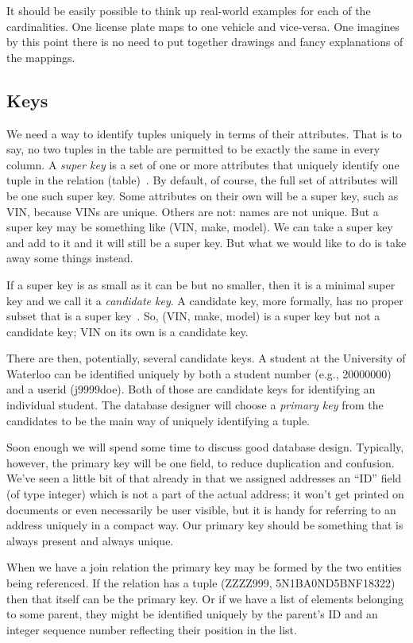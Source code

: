 It should be easily possible to think up real-world examples for each of the cardinalities. One license plate maps to one vehicle and vice-versa. One imagines by this point there is no need to put together drawings and fancy explanations of the mappings.

\subsection*{Keys}

We need a way to identify tuples uniquely in terms of their attributes. That is to say, no two tuples in the table are permitted to be exactly the same in every column. A \textit{super key} is a set of one or more attributes that uniquely identify one tuple in the relation (table)~\cite{dsc}. By default, of course, the full set of attributes will be one such super key. Some attributes on their own will be a super key, such as VIN, because VINs are unique. Others are not: names are not unique. But a super key may be something like (VIN, make, model). We can take a super key and add to it and it will still be a super key. But what we would like to do is take away some things instead.

If a super key is as small as it can be but no smaller, then it is a minimal super key and we call it a \textit{candidate key}. A candidate key, more formally, has no proper subset that is a super key~\cite{dsc}. So, (VIN, make, model) is a super key but not a candidate key; VIN on its own is a candidate key.

There are then, potentially, several candidate keys. A student at the University of Waterloo can be identified uniquely by both a student number (e.g., 20000000) and a userid (j9999doe). Both of those are candidate keys for identifying an individual student. The database designer will choose a \textit{primary key} from the candidates to be the main way of uniquely identifying a tuple. 

Soon enough we will spend some time to discuss good database design. Typically, however, the primary key will be one field, to reduce duplication and confusion. We've seen a little bit of that already in that we assigned addresses an ``ID'' field (of type integer) which is not a part of the actual address; it won't get printed on documents or even necessarily be user visible, but it is handy for referring to an address uniquely in a compact way. Our primary key should be something that is always present and always unique.

When we have a join relation the primary key may be formed by the two entities being referenced. If the relation has a tuple (ZZZZ999, 5N1BA0ND5BNF18322) then that itself can be the primary key. Or if we have a list of elements belonging to some parent, they might be identified uniquely by the parent's ID and an integer sequence number reflecting their position in the list. 


